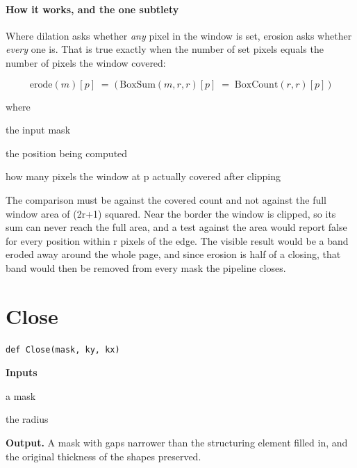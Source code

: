 \paragraph{How it works, and the one subtlety}
Where dilation asks whether \emph{any} pixel in the window is set, erosion asks whether \emph{every} one is. That is true exactly when the number of set pixels equals the number of pixels the window covered:


\begin{equation}
\mathrm{erode}(m)[p] \;=\; \big(\,\mathrm{BoxSum}(m,r,r)[p]\;=\;\mathrm{BoxCount}(r,r)[p]\,\big)
\end{equation}

\noindent where
\begin{description}[leftmargin=2.4em,style=nextline,font=\normalfont\ttfamily]\setlength\itemsep{1pt}
  \item[{$m$}] \normalfont the input mask
  \item[{$p$}] \normalfont the position being computed
  \item[{$\mathrm{BoxCount}(r,r)[p]$}] \normalfont how many pixels the window at p actually covered after clipping
\end{description}
The comparison must be against the covered count and not against the full window area of (2r+1) squared. Near the border the window is clipped, so its sum can never reach the full area, and a test against the area would report false for every position within r pixels of the edge. The visible result would be a band eroded away around the whole page, and since erosion is half of a closing, that band would then be removed from every mask the pipeline closes.


\section{Close}
\begin{lstlisting}[style=sig]
def Close(mask, ky, kx)
\end{lstlisting}

\noindent\textbf{Inputs}
\begin{description}[leftmargin=2.2em,style=nextline,font=\normalfont\ttfamily]\setlength\itemsep{1pt}
  \item[{m}] \normalfont a mask
  \item[{r}] \normalfont the radius
\end{description}

\noindent\textbf{Output.} A mask with gaps narrower than the structuring element filled in, and the original thickness of the shapes preserved.


